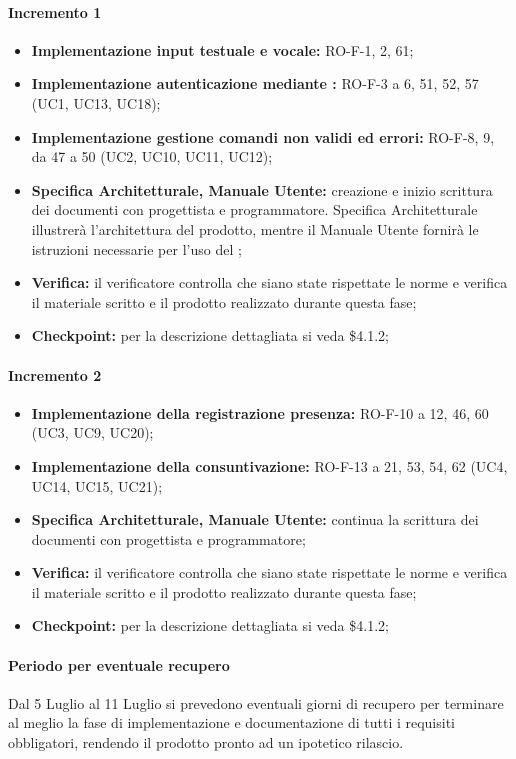 \paragraph{Incremento 1}
\begin{itemize}
    \item \textbf{Implementazione input testuale e vocale:} RO-F-1, 2, 61;
    \item \textbf{Implementazione autenticazione mediante :} RO-F-3 a 6, 51, 52, 57 (UC1, UC13, UC18);
    \item \textbf{Implementazione gestione comandi non validi ed errori:} RO-F-8, 9, da 47 a 50 (UC2, UC10, UC11, UC12);
    \item \textbf{Specifica Architetturale, Manuale Utente:} creazione e inizio scrittura dei documenti con progettista e programmatore. Specifica Architetturale illustrerà l'architettura del prodotto, mentre il Manuale Utente fornirà le istruzioni necessarie per l'uso del ;
    \item \textbf{Verifica:} il verificatore controlla che siano state rispettate le norme e verifica il materiale scritto e il prodotto realizzato durante questa fase;
    \item \textbf{Checkpoint:} per la descrizione dettagliata si veda \$4.1.2;
\end{itemize}

\paragraph{Incremento 2}
\begin{itemize}
    \item \textbf{Implementazione della registrazione presenza:} RO-F-10 a 12, 46, 60 (UC3, UC9, UC20);
    \item \textbf{Implementazione della consuntivazione:} RO-F-13 a 21, 53, 54, 62 (UC4, UC14, UC15, UC21);
    \item \textbf{Specifica Architetturale, Manuale Utente:} continua la scrittura dei documenti con progettista e programmatore;
    \item \textbf{Verifica:} il verificatore controlla che siano state rispettate le norme e verifica il materiale scritto e il prodotto realizzato durante questa fase;
    \item \textbf{Checkpoint:} per la descrizione dettagliata si veda \$4.1.2;
\end{itemize}

\paragraph*{Periodo per eventuale recupero}
Dal 5 Luglio al 11 Luglio si prevedono eventuali giorni di recupero per terminare al meglio la fase di implementazione e documentazione di tutti i requisiti obbligatori, rendendo il prodotto pronto ad un ipotetico rilascio.

